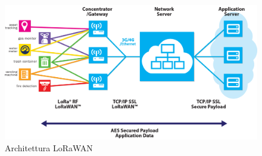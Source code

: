 \documentclass[12pt,a4paper,openright,twoside]{report}
\begin{document}
\begin{figure}[h]                      
\begin{center} 
\includegraphics[width=\textwidth]{tologia-lorawan.png}
\caption[Architettura LoRaWAN]{Architettura LoRaWAN} \label{fig:venti}
\end{center}
\end{figure}
\end{document}
